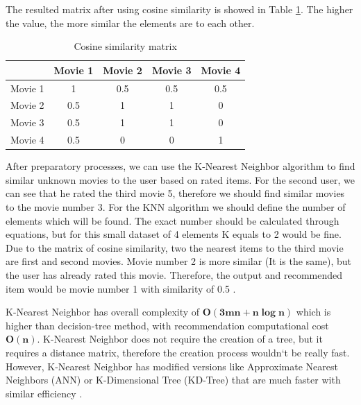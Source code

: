 The resulted matrix after using cosine similarity is showed in Table \ref{tab:cosine_similarity_matrix}. The higher the value, the more similar the elements are to each other.
\begin{table}[h]
    \centering
    \begin{tabular}{|c|c|c|c|c|}
        \hline
         & Movie 1 & Movie 2 & Movie 3 & Movie 4 \\        
        \hline
        Movie 1 &1		&0.5	&0.5	&0.5\\
        \hline	
        Movie 2 &0.5	&1      &1		&0	\\
        \hline
        Movie 3 &0.5	&1		&1		&0	\\
        \hline
        Movie 4 &0.5	&0		&0		&1	\\
        \hline
    \end{tabular}
    \caption{Cosine similarity matrix}\label{tab:cosine_similarity_matrix}
\end{table}

After preparatory processes, we can use the K-Nearest Neighbor algorithm to find similar unknown movies to the user based on rated items. For the second user, we can see that he rated the third movie 5, therefore we should find similar movies to the movie number 3. For the KNN algorithm we should define the number of elements which will be found. The exact number should be calculated through equations, but for this small dataset of 4 elements K equals to 2 would be fine. Due to the matrix of cosine similarity, two the nearest items to the third movie are first and second movies. Movie number 2 is more similar (It is the same), but the user has already rated this movie. Therefore, the output and recommended item would be movie number 1 with similarity of 0.5 .

K-Nearest Neighbor has overall complexity of  $\boldsymbol{O(3mn + n \log n)}$ \cite{KNN_complexity} which is higher than decision-tree method, with recommendation computational cost $\mathbf{O(n)}$. K-Nearest Neighbor does not require the creation of a tree, but it requires a distance matrix, therefore the creation process wouldn`t be really fast. However, K-Nearest Neighbor has modified versions like Approximate Nearest Neighbors (ANN) or K-Dimensional Tree (KD-Tree) that are much faster with similar efficiency \cite{KNN_modifications}.
